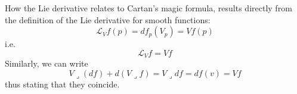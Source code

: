 \section{} 
\subsection{}
How the Lie derivative relates to Cartan's magic formula, results directly from the definition of the Lie derivative for smooth functions:
\[\mathcal{L}_Vf(p)  = df_p(V_p) = Vf(p)\]
i.e.
\[\mathcal{L}_Vf  = Vf\]
Similarly, we can write
\[V \lrcorner(df) + d(V \lrcorner f) = V \lrcorner df = df(v) = Vf\]
thus stating that they coincide.

\subsection{} 
